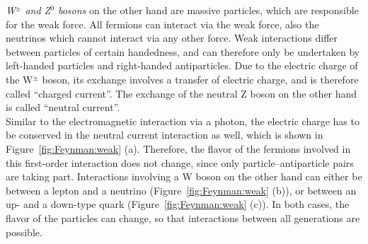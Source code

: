 \begin{minipage}{0.55\textwidth}
\textit{W$^\pm$ and Z$^0$ bosons} on the other hand are massive particles, which are responsible for the weak force.
All fermions can interact via the weak force, also the neutrinos which cannot interact via any other force.
Weak interactions differ between particles of certain handedness, and can therefore only be undertaken by left-handed particles and right-handed antiparticles.
Due to the electric charge of the W$^\pm$ boson, its exchange involves a transfer of electric charge, and is therefore called ``charged current''.
The exchange of the neutral Z boson on the other hand is called ``neutral current''.\\
Similar to the electromagnetic interaction via a photon, the electric charge has to be conserved in the neutral current interaction as well, which is shown in Figure~\ref{fig:Feynman:weak} (a).
Therefore, the flavor of the fermions involved in this first-order interaction does not change, since only particle--antiparticle pairs are taking part.
Interactions involving a W boson on the other hand can either be between a lepton and a neutrino (Figure~\ref{fig:Feynman:weak} (b)), or between an up- and a down-type quark (Figure~\ref{fig:Feynman:weak} (c)). 
In both cases, the flavor of the particles can change, so that interactions between all generations are possible.
\end{minipage} \hfill
